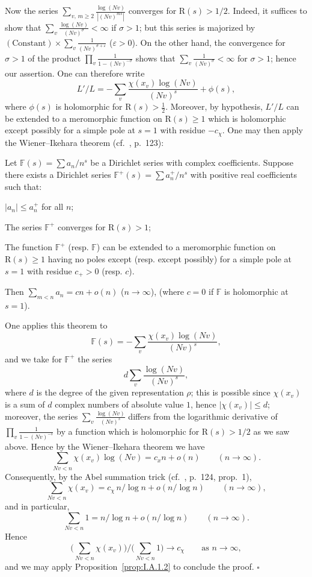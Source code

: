 Now the series $\sum_{v,\,m \geq 2} \frac{\log(Nv)}{|(Nv)^{ms}|}$ converges for $\mathrm{R}(s) > 1/2$. Indeed, it suffices to show that $\sum_v \frac{\log(Nv)}{(Nv)^\sigma} < \infty$ if $\sigma > 1$; but this series is majorized by $(\mathrm{Constant}) \times \sum_v \frac{1}{(Nv)^{\sigma + \varepsilon}}$ ($\varepsilon > 0$). On the other hand, the convergence for $\sigma > 1$ of the product $\prod_v \frac{1}{1 - (Nv)^{-\sigma}}$ shows that $\sum_v \frac{1}{(Nv)^\sigma} < \infty$ for $\sigma > 1$; hence our assertion. One can therefore write
\[
L'/L = -\sum_v \frac{\chi(x_v) \log(Nv)}{(Nv)^s} + \phi(s),
\]
where $\phi(s)$ is holomorphic for $\mathrm{R}(s) > \frac{1}{2}$. Moreover, by hypothesis, $L'/L$ can be extended to a meromorphic function on $\mathrm{R}(s) \geq 1$ which is holomorphic except possibly for a simple pole at $s = 1$ with residue $-c_\chi$. One may then apply the Wiener--Ikehara theorem (cf.~\cite{lang-algnum}, p.~123):

\begin{theorem}\label{thm:wiener-ikehara}
Let $\mathbb{F}(s) = \sum a_n / n^s$ be a Dirichlet series with complex coefficients. Suppose there exists a Dirichlet series $\mathbb{F}^+(s) = \sum a_n^+ / n^s$ with positive real coefficients such that:
\begin{nlist}
\item $|a_n| \leq a_n^+$ for all $n$;
\item The series $\mathbb{F}^+$ converges for $\mathrm{R}(s) > 1$;
\item The function $\mathbb{F}^+$ (resp. $\mathbb{F}$) can be extended to a meromorphic function on $\mathrm{R}(s) \geq 1$ having no poles except (resp. except possibly) for a simple pole at $s = 1$ with residue $c_+ > 0$ (resp. $c$).
\end{nlist}
Then $\sum_{m<n} a_n = cn + o(n)$ ($n \to \infty$), (where $c = 0$ if $\mathbb{F}$ is holomorphic at $s = 1$).
\end{theorem}

One applies this theorem to
\[
\mathbb{F}(s) = -\sum_v \frac{\chi(x_v) \log(Nv)}{(Nv)^s},
\]
and we take for $\mathbb{F}^+$ the series
\[
d \sum_v \frac{\log(Nv)}{(Nv)^s},
\]
where $d$ is the degree of the given representation $\rho$; this is possible since $\chi(x_v)$ is a sum of $d$ complex numbers of absolute value $1$, hence $|\chi(x_v)| \leq d$; moreover, the series $\sum_v \frac{\log(Nv)}{(Nv)^s}$ differs from the logarithmic derivative of $\prod_v \frac{1}{1 - (Nv)^{-s}}$ by a function which is holomorphic for $\mathrm{R}(s) > 1/2$ as we saw above. Hence by the Wiener--Ikehara theorem we have
\[
\sum_{Nv < n} \chi(x_v) \log(Nv) = c_x n + o(n) \qquad (n \to \infty).
\]
Consequently, by the Abel summation trick (cf.~\cite{lang-algnum}, p.~124, prop.~1),
\[
\sum_{Nv < n} \chi(x_v) = c_\chi \, n/\log n + o(n/\log n) \qquad (n \to \infty),
\]
and in particular,
\[
\sum_{Nv < n} 1 = n/\log n + o(n/\log n) \qquad (n \to \infty).
\]
Hence
\[
\bigl(\sum_{Nv < n} \chi(x_v)\bigr) / \bigl(\sum_{Nv < n} 1\bigr) \longrightarrow c_\chi \qquad \text{as } n \to \infty,
\]
and we may apply Proposition~\ref{prop:I.A.1.2} to conclude the proof. $\square$
